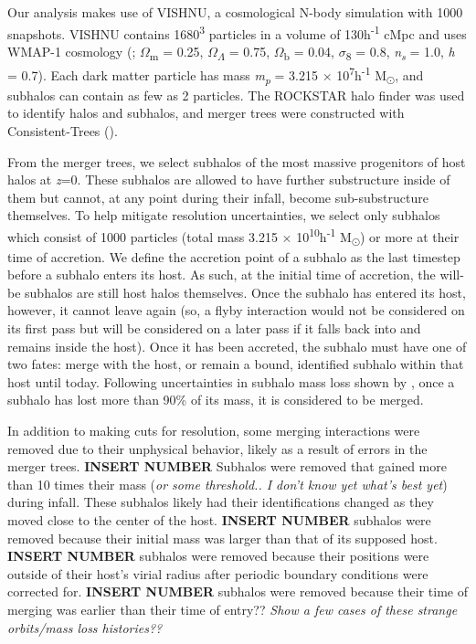 \documentclass[fleqn,usenatbib]{mnras}
\begin{document}
	Our analysis makes use of VISHNU, a cosmological N-body simulation with 1000 snapshots. VISHNU contains 1680\textsuperscript{3} particles in a volume of 130h\textsuperscript{-1} cMpc and uses WMAP-1 cosmology (\citet{Spergel2013}; $\Omega$\textsubscript{m} = 0.25, $\Omega$\textsubscript{$\Lambda$} = 0.75, $\Omega$\textsubscript{b} = 0.04, $\sigma$\textsubscript{8} = 0.8, \textit{n\textsubscript{s}} = 1.0, \textit{h} = 0.7). Each dark matter particle has mass \textit{m\textsubscript{p}} = 3.215 $\times$ 10\textsuperscript{7}h\textsuperscript{-1} M\textsubscript{\(\odot\)}, and subhalos can contain as few as 2 particles. The ROCKSTAR halo finder was used to identify halos and subhalos, and merger trees were constructed with Consistent-Trees (\citet{Behroozi2013b}).
\par
    From the merger trees, we select subhalos of the most massive progenitors of host halos at \textit{z}=0. These subhalos are allowed to have further substructure inside of them but cannot, at any point during their infall, become sub-substructure themselves. To help mitigate resolution uncertainties, we select only subhalos which consist of 1000 particles (total mass 3.215 $\times$ 10\textsuperscript{10}h\textsuperscript{-1} M\textsubscript{\(\odot\)}) or more at their time of accretion. We define the accretion point of a subhalo as the last timestep before a subhalo enters its host. As such, at the initial time of accretion, the will-be subhalos are still host halos themselves. Once the subhalo has entered its host, however, it cannot leave again (so, a flyby interaction would not be considered on its first pass but will be considered on a later pass if it falls back into and remains inside the host). Once it has been accreted, the subhalo must have one of two fates: merge with the host, or remain a bound, identified subhalo within that host until today. Following uncertainties in subhalo mass loss shown by \citet{VDB2018}, once a subhalo has lost more than 90\% of its mass, it is considered to be merged.
\par
    In addition to making cuts for resolution, some merging interactions were removed due to their unphysical behavior, likely as a result of errors in the merger trees. \textbf{INSERT NUMBER} Subhalos were removed that gained more than 10 times their mass (\textit{or some threshold.. I don't know yet what's best yet}) during infall. These subhalos likely had their identifications changed as they moved close to the center of the host. \textbf{INSERT NUMBER} subhalos were removed because their initial mass was larger than that of its supposed host. \textbf{INSERT NUMBER} subhalos were removed because their positions were outside of their host's virial radius after periodic boundary conditions were corrected for. \textbf{INSERT NUMBER} subhalos were removed because their time of merging was earlier than their time of entry?? \textit{Show a few cases of these strange orbits/mass loss histories??}
\end{document}
